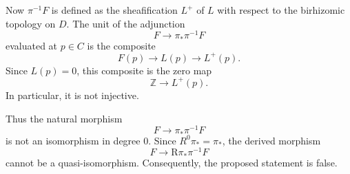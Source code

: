 \documentclass[11pt]{article}
\begin{document}
Now \(\pi^{-1}F\) is defined as the sheafification \(L^+\) of \(L\) with respect to the birhizomic topology on \(D\). The unit of the adjunction
\[
F\longrightarrow \pi_*\pi^{-1}F
\]
evaluated at \(p\in C\) is the composite
\[
F(p)\longrightarrow L(p)\longrightarrow L^+(p).
\]
Since \(L(p)=0\), this composite is the zero map
\[
\mathbb Z\longrightarrow L^+(p).
\]
In particular, it is not injective.

Thus the natural morphism
\[
F\longrightarrow \pi_*\pi^{-1}F
\]
is not an isomorphism in degree \(0\). Since \(R^0\pi_*=\pi_*\), the derived morphism
\[
F\longrightarrow \mathrm R\pi_*\pi^{-1}F
\]
cannot be a quasi-isomorphism. Consequently, the proposed statement is false.
\end{document}
